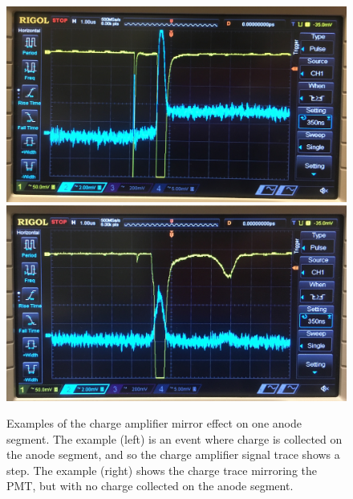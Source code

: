 \begin{figure}[htbp]
\begin{center}
\includegraphics[width=\halffig]{figures/etrains/900V_raw_charge.jpg}
\includegraphics[width=\halffig]{figures/etrains/900V_raw_nocharge.jpg}
\caption{Examples of the charge amplifier mirror effect on one anode segment. The example (left) is an event where charge is collected on the anode segment, and so the charge amplifier signal trace shows a step. The example (right) shows the charge trace mirroring the \acs{PMT}, but with no charge collected on the anode segment.}
\label{fig:charge_reflections}
\end{center}
\end{figure}

